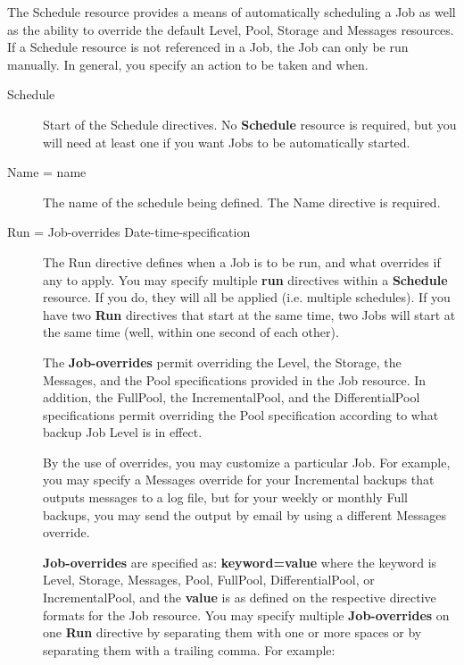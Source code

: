 The Schedule resource provides a means of automatically scheduling a Job as
well as the ability to override the default Level, Pool, Storage and Messages
resources. If a Schedule resource is not referenced in a Job, the Job can only
be run manually. In general, you specify an action to be taken and when. 

\begin{description}

\item [Schedule]
   Start of the Schedule directives.  No {\bf Schedule} resource is
   required, but you will need at least one if you want Jobs to be
   automatically started.

\item [Name = \lt{}name\gt{}]
   The name of the schedule being defined.  The Name directive is required. 

\item [Run = \lt{}Job-overrides\gt{} \lt{}Date-time-specification\gt{}]
   The Run directive defines when a Job is to be run, and what overrides if
   any to apply.  You may specify multiple {\bf run} directives within a
   {\bf Schedule} resource.  If you do, they will all be applied (i.e.
   multiple schedules).  If you have two {\bf Run} directives that start at
   the same time, two Jobs will start at the same time (well, within one
   second of each other).

   The {\bf Job-overrides} permit overriding the Level, the Storage, the
   Messages, and the Pool specifications provided in the Job resource.  In
   addition, the FullPool, the IncrementalPool, and the DifferentialPool
   specifications permit overriding the Pool specification according to
   what backup Job Level is in effect.

   By the use of overrides, you may customize a particular Job.  For
   example, you may specify a Messages override for your Incremental
   backups that outputs messages to a log file, but for your weekly or
   monthly Full backups, you may send the output by email by using a
   different Messages override.

   {\bf Job-overrides} are specified as: {\bf keyword=value} where the
   keyword is Level, Storage, Messages, Pool, FullPool, DifferentialPool,
   or IncrementalPool, and the {\bf value} is as defined on the respective
   directive formats for the Job resource.  You may specify multiple {\bf
   Job-overrides} on one {\bf Run} directive by separating them with one or
   more spaces or by separating them with a trailing comma.  For example:


\end{description}

